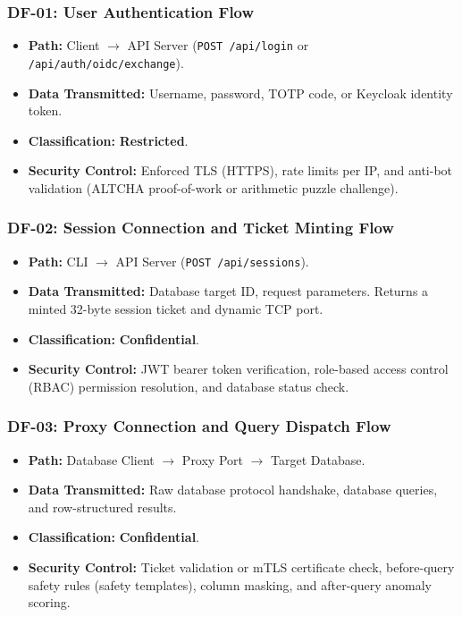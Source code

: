 \subsubsection{DF-01: User Authentication Flow}
\begin{itemize}[leftmargin=*]
    \item \textbf{Path:} Client $\rightarrow$ API Server (\texttt{POST /api/login} or \texttt{/api/auth/oidc/exchange}).
    \item \textbf{Data Transmitted:} Username, password, TOTP code, or Keycloak identity token.
    \item \textbf{Classification:} \textbf{Restricted}.
    \item \textbf{Security Control:} Enforced TLS (HTTPS), rate limits per IP, and anti-bot validation (ALTCHA proof-of-work or arithmetic puzzle challenge).
\end{itemize}

\subsubsection{DF-02: Session Connection and Ticket Minting Flow}
\begin{itemize}[leftmargin=*]
    \item \textbf{Path:} CLI $\rightarrow$ API Server (\texttt{POST /api/sessions}).
    \item \textbf{Data Transmitted:} Database target ID, request parameters. Returns a minted 32-byte session ticket and dynamic TCP port.
    \item \textbf{Classification:} \textbf{Confidential}.
    \item \textbf{Security Control:} JWT bearer token verification, role-based access control (RBAC) permission resolution, and database status check.
\end{itemize}

\subsubsection{DF-03: Proxy Connection and Query Dispatch Flow}
\begin{itemize}[leftmargin=*]
    \item \textbf{Path:} Database Client $\rightarrow$ Proxy Port $\rightarrow$ Target Database.
    \item \textbf{Data Transmitted:} Raw database protocol handshake, database queries, and row-structured results.
    \item \textbf{Classification:} \textbf{Confidential}.
    \item \textbf{Security Control:} Ticket validation or mTLS certificate check, before-query safety rules (safety templates), column masking, and after-query anomaly scoring.
\end{itemize}

